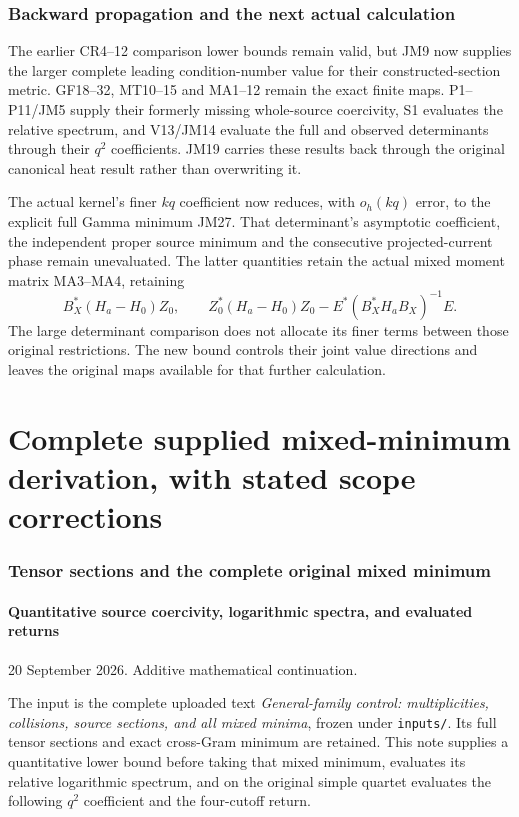 \documentclass[11pt]{article}
\begin{document}
\section{Backward propagation and the next actual calculation}
The earlier CR4--12 comparison lower bounds remain valid, but JM9
now supplies the larger complete leading condition-number value
for their constructed-section metric. GF18--32, MT10--15 and MA1--12
remain the exact finite maps. P1--P11/JM5 supply their formerly
missing whole-source coercivity, S1 evaluates the relative spectrum,
and V13/JM14 evaluate the full and observed determinants through
their $q^2$ coefficients. JM19 carries these results back through
the original canonical heat result rather than overwriting it.

The actual kernel's finer $kq$ coefficient now reduces, with
$o_h(kq)$ error, to the explicit full Gamma minimum JM27.
That determinant's asymptotic coefficient, the independent proper
source minimum and the consecutive projected-current phase remain
unevaluated. The latter quantities retain the actual mixed
moment matrix MA3--MA4, retaining
\[
 B_X^*(H_a-H_0)Z_0,\qquad
 Z_0^*(H_a-H_0)Z_0-E^*(B_X^*H_aB_X)^{-1}E.\tag{JM20}
\]
The large determinant comparison does not allocate its finer terms
between those original restrictions. The new bound controls their
joint value directions and leaves the original maps available for
that further calculation.



\clearpage
\part*{Complete supplied mixed-minimum derivation, with stated scope corrections}
\section{Tensor sections and the complete original mixed minimum}\label{tensor-sections-and-the-complete-original-mixed-minimum}

\subsection{Quantitative source coercivity, logarithmic spectra, and evaluated returns}\label{quantitative-source-coercivity-logarithmic-spectra-and-evaluated-returns}

20 September 2026. Additive mathematical continuation.

The input is the complete uploaded text \emph{General-family control: multiplicities, collisions, source sections, and all mixed minima}, frozen under \texttt{inputs/}. Its full tensor sections and exact cross-Gram minimum are retained. This note supplies a quantitative lower bound before taking that mixed minimum, evaluates its relative logarithmic spectrum, and on the original simple quartet evaluates the following \(q^2\) coefficient and the four-cutoff return.
\end{document}
